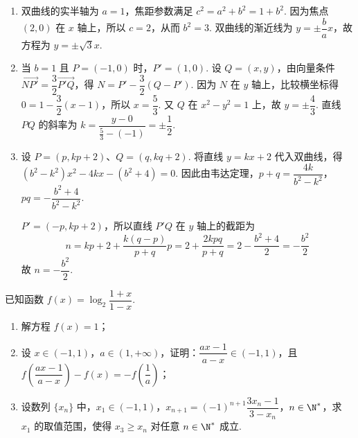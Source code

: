 \begin{solution}
\begin{enumerate}
\item 双曲线的实半轴为 \(a=1\)，焦距参数满足 \(c^2=a^2+b^2=1+b^2\). 因为焦点 \((2,0)\) 在 \(x\) 轴上，所以 \(c=2\)，从而 \(b^2=3\). 双曲线的渐近线为 \(y=\pm\dfrac ba x\)，故方程为 \(y=\pm\sqrt3x\).
\item 当 \(b=1\) 且 \(P=(-1,0)\) 时，\(P'=(1,0)\). 设 \(Q=(x,y)\)，由向量条件 \(\overrightarrow{NP'}=\dfrac32\overrightarrow{P'Q}\)，得 \(N=P'-\dfrac32(Q-P')\). 因为 \(N\) 在 \(y\) 轴上，比较横坐标得 \(0=1-\dfrac32(x-1)\)，所以 \(x=\dfrac53\). 又 \(Q\) 在 \(x^2-y^2=1\) 上，故 \(y=\pm\dfrac43\). 直线 \(PQ\) 的斜率为 \(k=\dfrac{y-0}{\frac53-(-1)}=\pm\dfrac12\).
\item 设 \(P=(p,kp+2)\)、\(Q=(q,kq+2)\). 将直线 \(y=kx+2\) 代入双曲线，得 \((b^2-k^2)x^2-4kx-(b^2+4)=0\). 因此由韦达定理，\(p+q=\dfrac{4k}{b^2-k^2}\)，\(pq=-\dfrac{b^2+4}{b^2-k^2}\).

\(P'=(-p,kp+2)\)，所以直线 \(P'Q\) 在 \(y\) 轴上的截距为
\[
n=kp+2+\frac{k(q-p)}{p+q}p=2+\frac{2kpq}{p+q}=2-\frac{b^2+4}{2}=-\frac{b^2}{2}
\]
故 \(n=-\dfrac{b^2}{2}\).
\end{enumerate}
\end{solution}

\begin{problem}
已知函数 \(f(x)=\log_2\dfrac{1+x}{1-x}\).

\begin{enumerate}
\item 解方程 \(f(x)=1\)；
\item 设 \(x\in(-1,1)\)，\(a\in(1,+\infty)\)，证明：\(\dfrac{ax-1}{a-x}\in(-1,1)\)，且 \(f\!\left(\dfrac{ax-1}{a-x}\right)-f(x)=-f\!\left(\dfrac1a\right)\)；
\item 设数列 \(\{x_n\}\) 中，\(x_1\in(-1,1)\)，\(x_{n+1}=(-1)^{n+1}\dfrac{3x_n-1}{3-x_n}\)，\(n\in\N^*\)，求 \(x_1\) 的取值范围，使得 \(x_3\ge x_n\) 对任意 \(n\in\N^*\) 成立.
\end{enumerate}
\end{problem}


